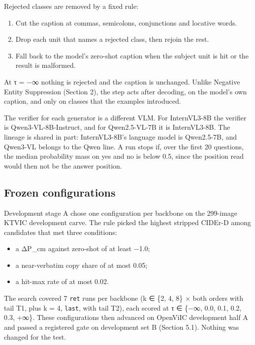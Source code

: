 \documentclass[manuscript,screen]{acmart}
\providecommand{\tightlist}{\setlength{\itemsep}{0pt}\setlength{\parskip}{0pt}}
\begin{document}
Rejected classes are removed by a fixed rule:

\begin{enumerate}
\def\labelenumi{\arabic{enumi}.}
\tightlist
\item
  Cut the caption at commas, semicolons, conjunctions and locative words.
\item
  Drop each unit that names a rejected class, then rejoin the rest.
\item
  Fall back to the model's zero-shot caption when the subject unit is hit or the result is
  malformed.
\end{enumerate}

At τ = −∞ nothing is rejected and the caption is unchanged. Unlike Negative Entity Suppression
\citep{Lu2025NES} (Section 2), the step acts after decoding, on the model's own caption, and only on
classes that the examples introduced.

The verifier for each generator is a different VLM. For InternVL3-8B the verifier is
Qwen3-VL-8B-Instruct, and for Qwen2.5-VL-7B it is InternVL3-8B. The lineage is shared in part:
InternVL3-8B's language model is Qwen2.5-7B, and Qwen3-VL belongs to the Qwen line. A run stops if,
over the first 20 questions, the median probability mass on yes and no is below 0.5, since the
position read would then not be the answer position.

\subsection{Frozen configurations}\label{frozen-configurations}

Development stage A chose one configuration per backbone on the 299-image KTVIC development carve.
The rule picked the highest stripped CIDEr-D among candidates that met three conditions:

\begin{itemize}
\tightlist
\item
  a ΔP\_cm against zero-shot of at least −1.0;
\item
  a near-verbatim copy share of at most 0.05;
\item
  a hit-max rate of at most 0.02.
\end{itemize}

The search covered 7 \texttt{ret} runs per backbone (k ∈ \{2, 4, 8\} × both orders with tail T1,
plus k = 4, \texttt{last}, with tail T2), each scored at τ ∈ \{−∞, 0.0, 0.1, 0.2, 0.3, +∞\}. These
configurations then advanced on OpenViIC development half A and passed a registered gate on
development set B (Section 5.1). Nothing was changed for the test.
\end{document}
